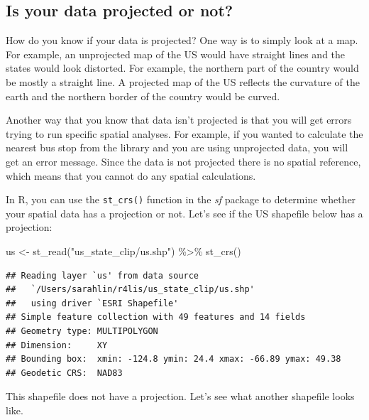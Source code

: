 \documentclass[
  krantz2]{krantz}
\makeatletter
\newenvironment{Shaded}{\begin{snugshade}}{\end{snugshade}}
\newcommand{\FunctionTok}[1]{\textcolor[rgb]{0,0,0}{#1}}
\newcommand{\NormalTok}[1]{#1}
\newcommand{\OtherTok}[1]{\textcolor[rgb]{0.37,0.37,0.37}{#1}}
\newcommand{\SpecialCharTok}[1]{\textcolor[rgb]{0,0,0}{#1}}
\newcommand{\StringTok}[1]{\textcolor[rgb]{0.5,0.5,0.5}{#1}}
\newenvironment{kframe}{%
\medskip{}
\setlength{\fboxsep}{.8em}
 \def\at@end@of@kframe{}%
 \ifinner\ifhmode%
  \def\at@end@of@kframe{\end{minipage}}%
  \begin{minipage}{\columnwidth}%
 \fi\fi%
 \def\FrameCommand##1{\hskip\@totalleftmargin \hskip-\fboxsep
 \colorbox{shadecolor}{##1}\hskip-\fboxsep
     \hskip-\linewidth \hskip-\@totalleftmargin \hskip\columnwidth}%
 \MakeFramed {\advance\hsize-\width
   \@totalleftmargin\z@ \linewidth\hsize
   \@setminipage}}%
 {\par\unskip\endMakeFramed%
 \at@end@of@kframe}
\renewenvironment{Shaded}{\begin{kframe}}{\end{kframe}}
\makeatother
\begin{document}
\hypertarget{is-your-data-projected-or-not}{%
\subsection{Is your data projected or not?}\label{is-your-data-projected-or-not}}

How do you know if your data is projected? One way is to simply look at a map. For example, an unprojected map of the US would have straight lines and the states would look distorted. For example, the northern part of the country would be mostly a straight line. A projected map of the US reflects the curvature of the earth and the northern border of the country would be curved.

Another way that you know that data isn't projected is that you will get errors trying to run specific spatial analyses. For example, if you wanted to calculate the nearest bus stop from the library and you are using unprojected data, you will get an error message. Since the data is not projected there is no spatial reference, which means that you cannot do any spatial calculations.

In R, you can use the \texttt{st\_crs()} function in the \emph{sf} package to determine whether your spatial data has a projection or not. Let's see if the US shapefile below has a projection:

\begin{Shaded}
\begin{Highlighting}[]
\NormalTok{us }\OtherTok{\textless{}{-}} \FunctionTok{st\_read}\NormalTok{(}\StringTok{"us\_state\_clip/us.shp"}\NormalTok{) }\SpecialCharTok{\%\textgreater{}\%}
  \FunctionTok{st\_crs}\NormalTok{()}
\end{Highlighting}
\end{Shaded}

\begin{verbatim}
## Reading layer `us' from data source
##   `/Users/sarahlin/r4lis/us_state_clip/us.shp'
##   using driver `ESRI Shapefile'
## Simple feature collection with 49 features and 14 fields
## Geometry type: MULTIPOLYGON
## Dimension:     XY
## Bounding box:  xmin: -124.8 ymin: 24.4 xmax: -66.89 ymax: 49.38
## Geodetic CRS:  NAD83
\end{verbatim}

This shapefile does not have a projection. Let's see what another shapefile looks like.
\end{document}
